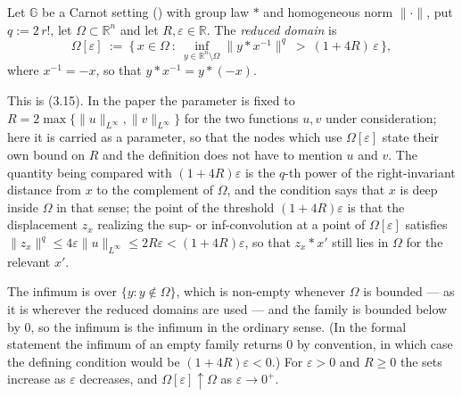 \begin{definition}
Let $\mathbb G$ be a Carnot setting () with group law $*$ and
homogeneous norm $\|\cdot\|$, put $q:=2\,r!$, let $\Omega\subset\mathbb R^n$ and let
$R,\varepsilon\in\mathbb R$. The \emph{reduced domain} is
\[
 \Omega[\varepsilon]\ :=\ \Big\{\,x\in\Omega\ :\
   \inf_{y\in\mathbb R^n\setminus\Omega}\|y*x^{-1}\|^{q}\ >\ (1+4R)\,\varepsilon\,\Big\},
\]
where $x^{-1}=-x$, so that $y*x^{-1}=y*(-x)$.

This is (3.15). In the paper the parameter is fixed to
$R=2\max\{\|u\|_{L^\infty},\|v\|_{L^\infty}\}$ for the two functions $u,v$ under
consideration; here it is carried as a parameter, so that the nodes which use
$\Omega[\varepsilon]$ state their own bound on $R$ and the definition does not have to
mention $u$ and $v$. The quantity being compared with $(1+4R)\varepsilon$ is the
$q$-th power of the right-invariant distance from $x$ to the complement of $\Omega$, and
the condition says that $x$ is deep inside $\Omega$ in that sense; the point of the
threshold $(1+4R)\varepsilon$ is that the displacement $z_x$ realizing the sup- or
inf-convolution at a point of $\Omega[\varepsilon]$ satisfies
$\|z_x\|^{q}\le4\varepsilon\|u\|_{L^\infty}\le2R\varepsilon<(1+4R)\varepsilon$, so that
$z_x*x'$ still lies in $\Omega$ for the relevant $x'$.

The infimum is over $\{y:y\notin\Omega\}$, which is non-empty whenever $\Omega$ is bounded
--- as it is wherever the reduced domains are used --- and the family is bounded below by
$0$, so the infimum is the infimum in the ordinary sense. (In the formal statement the
infimum of an empty family returns $0$ by convention, in which case the defining condition
would be $(1+4R)\varepsilon<0$.) For $\varepsilon>0$ and $R\ge0$ the sets increase as
$\varepsilon$ decreases, and $\Omega[\varepsilon]\uparrow\Omega$ as
$\varepsilon\to0^{+}$.
\end{definition}
